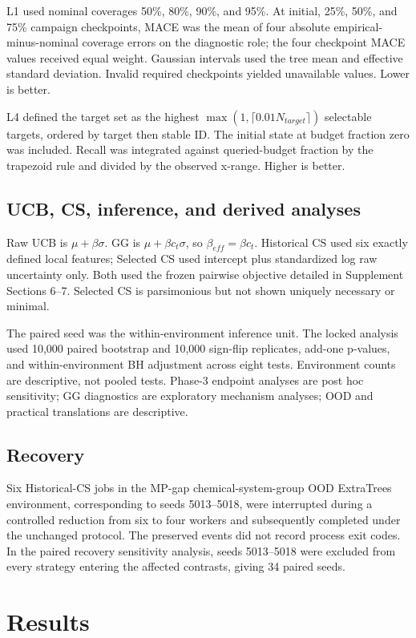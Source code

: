 \documentclass[10pt]{article}
\begin{document}
L1 used nominal coverages 50\%, 80\%, 90\%, and 95\%. At initial, 25\%, 50\%, and 75\% campaign checkpoints, MACE was the mean of four absolute empirical-minus-nominal coverage errors on the diagnostic role; the four checkpoint MACE values received equal weight. Gaussian intervals used the tree mean and effective standard deviation. Invalid required checkpoints yielded unavailable values. Lower is better.

L4 defined the target set as the highest $\max(1,\lceil0.01N_{target}\rceil)$ selectable targets, ordered by target then stable ID. The initial state at budget fraction zero was included. Recall was integrated against queried-budget fraction by the trapezoid rule and divided by the observed x-range. Higher is better.

\subsection{UCB, CS, inference, and derived analyses}
Raw UCB is $\mu+\beta\sigma$. GG is $\mu+\beta c_t\sigma$, so $\beta_{eff}=\beta c_t$. Historical CS used six exactly defined local features; Selected CS used intercept plus standardized log raw uncertainty only. Both used the frozen pairwise objective detailed in Supplement Sections 6--7. Selected CS is parsimonious but not shown uniquely necessary or minimal.

The paired seed was the within-environment inference unit. The locked analysis used 10,000 paired bootstrap and 10,000 sign-flip replicates, add-one p-values, and within-environment BH adjustment across eight tests. Environment counts are descriptive, not pooled tests. Phase-3 endpoint analyses are post hoc sensitivity; GG diagnostics are exploratory mechanism analyses; OOD and practical translations are descriptive.

\subsection{Recovery}
Six Historical-CS jobs in the MP-gap chemical-system-group OOD ExtraTrees environment, corresponding to seeds 5013--5018, were interrupted during a controlled reduction from six to four workers and subsequently completed under the unchanged protocol. The preserved events did not record process exit codes. In the paired recovery sensitivity analysis, seeds 5013--5018 were excluded from every strategy entering the affected contrasts, giving 34 paired seeds.

\section{Results}
\end{document}
